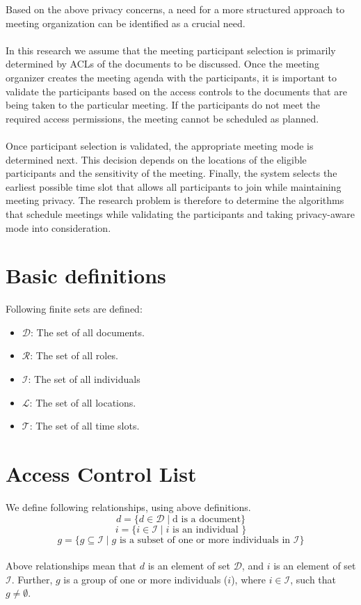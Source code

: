 Based on the above privacy concerns, a need for a more structured approach to meeting organization can be identified as a crucial need.
\\
\\
In this research we assume that the meeting participant selection is primarily determined by ACLs of the documents to be discussed. Once the meeting organizer creates the meeting agenda with the participants, it is important to validate the participants based on the access controls to the documents that are being taken to the particular meeting. If the participants do not meet the required access permissions, the meeting cannot be scheduled as planned.
\\
\\
Once participant selection is validated, the appropriate meeting mode is determined next. This decision depends on the locations of the eligible participants and the sensitivity of the meeting. Finally, the system selects the earliest possible time slot that allows all participants to join while maintaining meeting privacy. The research problem is therefore to determine the algorithms that schedule meetings while validating the participants and taking privacy-aware mode into consideration. 

\section{Basic definitions}

\noindent
Following finite sets are defined:
\begin{itemize}
    \item $\mathcal{D}$: The set of all documents.
    \item $\mathcal{R}$: The set of all roles.
    \item $\mathcal{I}$: The set of all individuals
    \item $\mathcal{L}$: The set of all locations.
    \item $\mathcal{T}$: The set of all time slots.
\end{itemize}

\section{Access Control List}
\noindent
We define following relationships, using above definitions.
\[ d = \{ d \in \mathcal{D} \mid \text{d is a document} \} \]
\[ i = \{ i \in \mathcal{I} \mid i \text{ is an individual } \} \]
\[ g = \{ g \subseteq \mathcal{I} \mid g \text{ is a subset of one or more individuals in } \mathcal{I} \} \] \\ 
\noindent
Above relationships mean that $d$ is an element of set $\mathcal{D}$, and $i$ is an element of set $\mathcal{I}$. Further, $g$ is a group of one or more individuals ($i$), where $i \in \mathcal{I}$, such that $g \ne \emptyset$.\\ 

